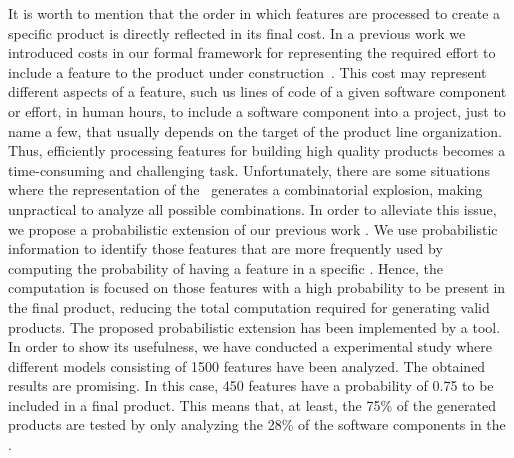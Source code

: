 It is worth to mention that the order in which features are processed to create a specific product is directly reflected in its final cost. In a previous work we introduced costs in our formal framework for representing the required effort to include a feature to the product under construction~\cite{cln16}. This cost may represent different aspects of a feature, such us lines of code of a given software component or effort, in human hours, to include a software component into a project, just to name a few, that usually depends on the target of the product line organization. Thus, efficiently processing features for building high quality products becomes a time-consuming and challenging task. Unfortunately, there are some situations where the representation of the \SPL\ generates a combinatorial explosion, making unpractical to analyze all possible combinations.
%
In order to alleviate this issue, we propose a probabilistic extension of our previous work \fodaPA. We use probabilistic information to identify those features that are more frequently used by computing the probability of having a feature in a specific \SPL. Hence, the computation is focused on those features with a high probability to be present in the final product, reducing the total computation required for generating valid products. The proposed probabilistic extension has been implemented by a tool. In order to show its usefulness, we have conducted a experimental study where different models consisting of 1500 features have been analyzed. The obtained results are promising. In this case, 450 features have a probability of 0.75 to be included in a final product. This means that, at least, the 75\% of the generated products are tested by only analyzing the 28\% of the software components in the \SPL.

